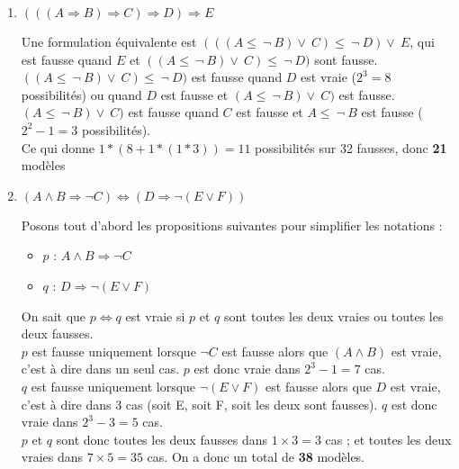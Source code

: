 \begin{enumerate}
	\item $(((A \Rightarrow B) \Rightarrow C) \Rightarrow D) \Rightarrow E$
    
    
    Une formulation équivalente est $(((A \leq\ \neg\ B) \lor\ C) \leq\ \neg\ D) \lor\ E$, qui est fausse quand $E$ et $((A \leq\ \neg\ B) \lor\ C) \leq\ \neg\ D)$ sont fausse. \\
    $((A \leq\ \neg\ B) \lor\ C) \leq\ \neg\ D)$ est fausse quand $D$ est vraie ($2^3 = 8$ possibilités) ou quand $D$ est fausse et $(A \leq\ \neg\ B) \lor\ C)$ est fausse. \\
    $(A \leq\ \neg\ B) \lor\ C)$ est fausse quand $C$ est fausse et $A \leq\ \neg\ B$ est fausse ($2^2 - 1 = 3$ possibilités).\\
    Ce qui donne $1* (8 + 1 * (1 * 3)) = 11$ possibilités sur 32 fausses, donc \textbf{21} modèles
    
	\item $(A \land B \Rightarrow \neg C) \Leftrightarrow (D \Rightarrow \neg(E \lor F))$
    
    Posons tout d'abord les propositions suivantes pour simplifier les notations :
    \begin{itemize}
        \item $p$ : $A \land B \Rightarrow \neg C$
        \item $q$ : $D \Rightarrow \neg(E \lor F)$
    \end{itemize}
    
    On sait que $p \Leftrightarrow q$ est vraie si $p$ et $q$ sont toutes les deux vraies ou toutes les deux fausses.\\
    $p$ est fausse uniquement lorsque $\neg C$ est fausse alors que $(A \land B)$ est vraie, c'est à dire dans un seul cas.
    $p$ est donc vraie dans $2^3-1=7$ cas.\\
    $q$ est fausse uniquement lorsque $\neg(E \lor F)$ est fausse alors que $D$ est vraie, c'est à dire dans 3 cas (soit E, soit F, soit les deux sont fausses).
    $q$ est donc vraie dans $2^3-3=5$ cas.\\
    $p$ et $q$ sont donc toutes les deux fausses dans $1 \times 3 = 3$ cas ; et toutes les deux vraies dans $7 \times 5 = 35$ cas.
    On a donc un total de \textbf{38} modèles.
\end{enumerate}
